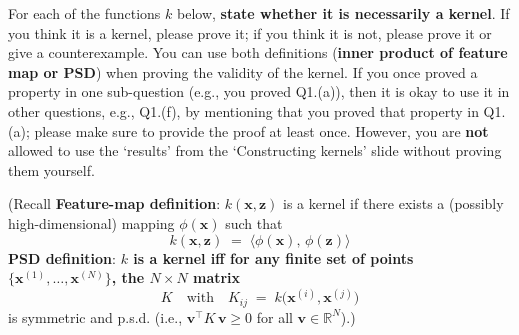 \documentclass[lang=cn,11pt]{elegantbook}
\begin{document}
For each of the functions $k$ below, \textbf{state whether it is necessarily a kernel}. If you think it is a kernel, please prove it; if you think it is not, please prove it or give a counterexample. You can use both definitions (\textbf{inner product of feature map or PSD}) when proving the validity of the kernel. If you once proved a property in one sub-question (e.g., you proved Q1.(a)), then it is okay to use it in other questions, e.g., Q1.(f), by mentioning that you proved that property in Q1.(a); please make sure to provide the proof at least once. However, you are \textbf{not} allowed to use the ‘results’ from the ‘Constructing kernels’ slide without proving them yourself.

(Recall \textbf{Feature-map definition}: \(k(\mathbf{x}, \mathbf{z})\) is a kernel if there exists a (possibly high-dimensional) mapping \(\phi(\mathbf{x})\) such that \[
     k(\mathbf{x}, \mathbf{z}) \;=\; \langle \phi(\mathbf{x}), \,\phi(\mathbf{z})\rangle
   \]
\textbf{PSD definition}: \textbf{\(k\) is a kernel iff for any finite set of points \(\{\mathbf{x}^{(1)}, \dots, \mathbf{x}^{(N)}\}\), the \(N \times N\) matrix } \[
      K \quad \text{with} \quad K_{ij} \;=\; k\bigl(\mathbf{x}^{(i)}, \mathbf{x}^{(j)}\bigr) \]
   is symmetric and p.s.d. (i.e., \(\mathbf{v}^\top K \,\mathbf{v} \ge 0\) for all \(\mathbf{v}\in \mathbb{R}^N\)).)\\\\
\end{document}

